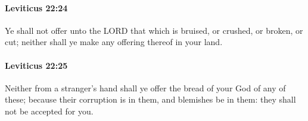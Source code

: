 		\paragraph{Leviticus 22:24} %
			\label{LEVITICUS-22-24}

			Ye shall not offer unto the LORD that which is bruised, or crushed, or broken, or cut; neither shall ye make any offering thereof in your land.


		\paragraph{Leviticus 22:25} %
			\label{LEVITICUS-22-25}

			Neither from a stranger’s hand shall ye offer the bread of your God of any of these; because their corruption is in them, and blemishes be in them: they shall not be accepted for you.


